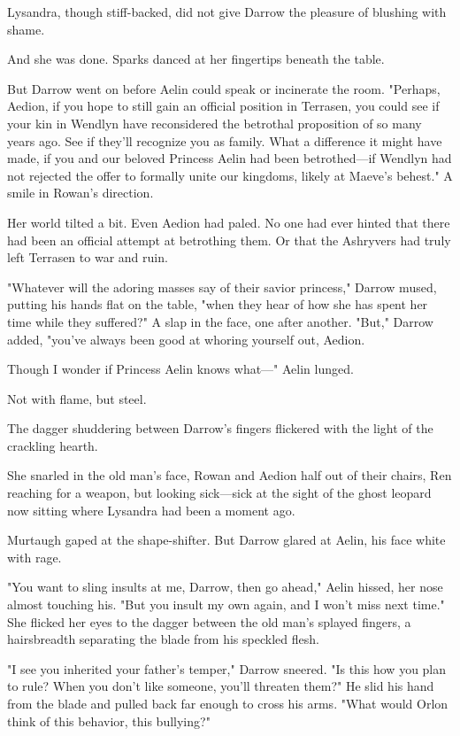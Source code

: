 Lysandra, though stiff-backed, did not give Darrow the pleasure of blushing with shame.

And she was done.
Sparks danced at her fingertips beneath the table.

But Darrow went on before Aelin could speak or incinerate the room.
"Perhaps, Aedion, if you hope to still gain an official position in Terrasen, you could see if your kin in Wendlyn have reconsidered the betrothal proposition of so many years ago. 
See if they'll recognize you as family. 
What a difference it might have made, if you and our beloved Princess Aelin had been betrothed---if Wendlyn had not rejected the offer to formally unite our kingdoms, likely at Maeve's behest." 
A smile in Rowan's direction.

Her world tilted a bit. 
Even Aedion had paled. 
No one had ever hinted that there had been an official attempt at betrothing them. 
Or that the Ashryvers had truly left Terrasen to war and ruin.

"Whatever will the adoring masses say of their savior princess," Darrow mused, putting his hands flat on the table, "when they hear of how she has spent her time while they suffered?" 
A slap in the face, one after another. 
"But," Darrow added, "you've always been good at whoring yourself out, Aedion.

Though I wonder if Princess Aelin knows what---" Aelin lunged.

Not with flame, but steel.

The dagger shuddering between Darrow's fingers flickered with the light of the crackling hearth.

She snarled in the old man's face, Rowan and Aedion half out of their chairs, Ren reaching for a weapon, but looking sick---sick at the sight of the ghost leopard now sitting where Lysandra had been a moment ago.

Murtaugh gaped at the shape-shifter.
But Darrow glared at Aelin, his face white with rage.

"You want to sling insults at me, Darrow, then go ahead," Aelin hissed, her nose almost touching his. 
"But you insult my own again, and I won't miss next time." 
She flicked her eyes to the dagger between the old man's splayed fingers, a hairsbreadth separating the blade from his speckled flesh.

"I see you inherited your father's temper," Darrow sneered. 
"Is this how you plan to rule? 
When you don't like someone, you'll threaten them?" 
He slid his hand from the blade and pulled back far enough to cross his arms. 
"What would Orlon think of this behavior, this bullying?"

